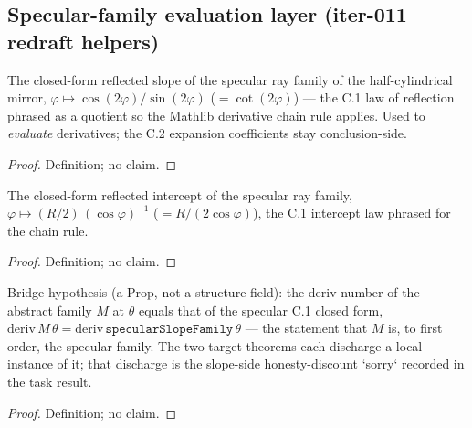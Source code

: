 
\subsection*{Specular-family evaluation layer (iter-011 redraft helpers)}

\begin{definition}
\label{def:IPhO2026Problems_problem_IPhO_2026_2_C_2:specularSlopeFamily}
The closed-form reflected slope of the specular ray family of the
half-cylindrical mirror, $\varphi \mapsto \cos(2\varphi)/\sin(2\varphi)$
($= \cot(2\varphi)$) --- the C.1 law of reflection phrased as a quotient
so the Mathlib derivative chain rule applies.  Used to \emph{evaluate}
derivatives; the C.2 expansion coefficients stay conclusion-side.
\end{definition}
\begin{proof}
Definition; no claim.
\end{proof}

\begin{definition}
\label{def:IPhO2026Problems_problem_IPhO_2026_2_C_2:specularInterceptFamily}
The closed-form reflected intercept of the specular ray family,
$\varphi \mapsto (R/2)\,(\cos\varphi)^{-1}$ ($= R/(2\cos\varphi)$), the
C.1 intercept law phrased for the chain rule.
\end{definition}
\begin{proof}
Definition; no claim.
\end{proof}

\begin{definition}
\label{def:IPhO2026Problems_problem_IPhO_2026_2_C_2:slopeFamily_deriv}
Bridge hypothesis (a Prop, not a structure field): the deriv-number of
the abstract family $M$ at $\theta$ equals that of the specular C.1
closed form, $\mathrm{deriv}\,M\,\theta =
\mathrm{deriv}\,\texttt{specularSlopeFamily}\,\theta$ --- the statement
that $M$ is, to first order, the specular family.  The two target
theorems each discharge a local instance of it; that discharge is the
slope-side honesty-discount `sorry` recorded in the task result.
\end{definition}
\begin{proof}
Definition; no claim.
\end{proof}

